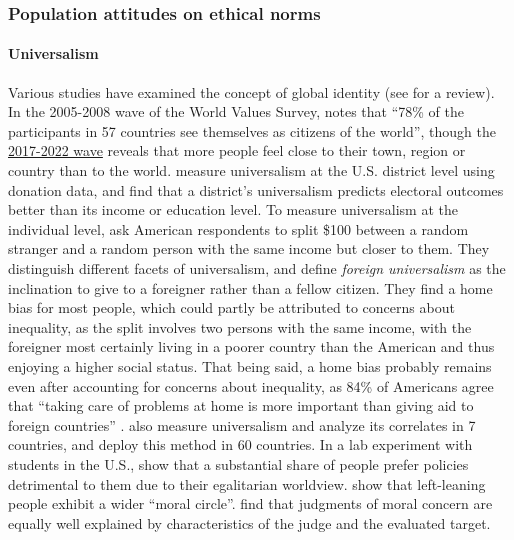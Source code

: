 
\subsubsection{Population attitudes on ethical norms}\label{subsubsec:literature_wealth_tax}

\paragraph{Universalism}
Various studies have examined the concept of global identity (see %
\citet{reysen_psychology_2018} for a review). In the 2005-2008 wave of the World Values Survey, \citet{bayram_what_2015} notes that ``78\% of the participants in 57 countries see themselves as citizens of the world'', though the \href{https://www.worldvaluessurvey.org/WVSDocumentationWV7.jsp}{2017-2022 wave} reveals that more people feel close to their town, region or country than to the world. \citet{enke_universalism_2023} measure universalism at the U.S. district level using donation data, and find that a district's universalism predicts electoral outcomes better than its income or education level. To measure universalism at the individual level, \citet{enke_moral_2023-1} ask American respondents to split \$100 between a random stranger and a random person with the same income but closer to them. They distinguish different facets of universalism, and define \textit{foreign universalism} as the inclination to give to a foreigner rather than a fellow citizen. They find a home bias for most people, which could partly be attributed to concerns about inequality, as the split involves two persons with the same income, with the foreigner most certainly living in a poorer country than the American and thus enjoying a higher social status. 
That being said, a home bias probably remains even after accounting for concerns about  inequality, as 84\% of Americans agree that ``taking care of problems at home is more important than giving aid to foreign countries'' \citep{pipa_americans_2001}. 
\citet{enke_moral_2023} also measure universalism and analyze its correlates in 7 countries, and \citet{cappelen_universalism_2022} deploy this method in 60 countries. 
In a lab experiment with students in the U.S., \citet{cherry_accepting_2017} show that a substantial share of people prefer policies detrimental to them due to their egalitarian worldview. \citet{waytz_ideological_2019} show that left-leaning people exhibit a wider ``moral circle''. \citet{jaeger_relative_2021} find that judgments of moral concern are equally well explained by characteristics of the judge and the evaluated target.

